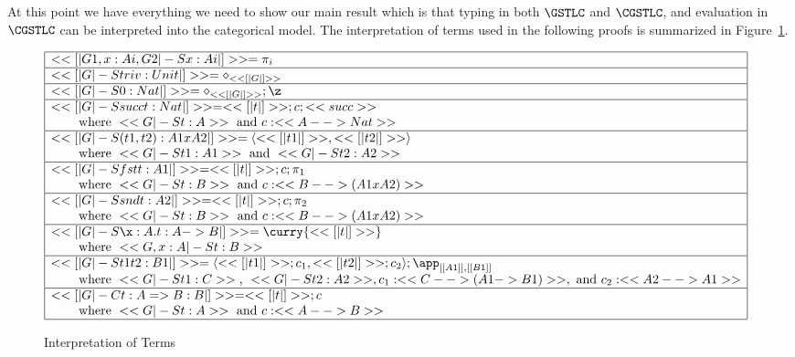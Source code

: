 At this point we have everything we need to show our main result which
is that typing in both $\GSTLC$ and $\CGSTLC$, and evaluation in
$\CGSTLC$ can be interpreted into the categorical model.  The
interpretation of terms used in the following proofs is summarized in
Figure~\ref{fig:interp-terms}.
\begin{figure}
  \small  
    \begin{center}
      \begin{math}
          \begin{array}{|l|}
            \hline
            << [| G1 , x : Ai , G2 |-S x : Ai |] >> = \pi_i\\
            \hline
            << [| G |-S triv : Unit |] >> = \diamond_{<< [| G |] >>}\\
            \hline
            << [| G |-S 0 : Nat |] >> = \diamond_{<< [| G |] >>};\z\\
            \hline
            << [| G |-S succ t : Nat |] >> = << [| t |] >>;c;<<succ>>\\
            \,\,\,\,\,\,\,\,\,\,\,\text{ where } <<G |-S t : A>>\text{ and }c : <<A --> Nat>>\\
            \hline
            << [| G |-S (t1,t2) : A1 x A2 |] >> = \langle << [| t1 |] >> , << [| t2 |] >> \rangle\\
            \,\,\,\,\,\,\,\,\,\,\,\text{ where } <<G |-S t1 : A1>>\text{ and } <<G |-S t2 : A2>>\\
            \hline
            << [| G |-S fst t : A1 |] >> = << [| t |] >>;c;\pi_1\\
            \,\,\,\,\,\,\,\,\,\,\,\text{ where } <<G |-S t : B>>\text{ and }c : <<B --> (A1 x A2)>>\\
            \hline
            << [| G |-S snd t : A2 |] >> = << [| t |] >>;c;\pi_2\\           
            \,\,\,\,\,\,\,\,\,\,\,\text{ where } <<G |-S t : B>>\text{ and }c : <<B --> (A1 x A2)>>\\
            \hline
            << [| G |-S \x:A.t : A -> B |] >> = \curry{<< [| t |] >>}\\
            \,\,\,\,\,\,\,\,\,\,\,\text{ where } <<G, x : A |-S t : B>>\\
            \hline
            << [| G |-S t1 t2 : B1 |] >> = \langle << [| t1 |] >>;c_1, << [| t2 |] >>;c_2\rangle;\app_{[[A1]],[[B1]]}\\
            \,\,\,\,\,\,\,\,\,\,\,\text{ where } <<G |-S t1 : C>>\text{, }<<G |-S t2 : A2>>, c_1 : <<C --> (A1 -> B1)>>, \text{ and }c_2 : <<A2 --> A1>>\\
            \hline
            << [| G |-C t : {A} => {B} : B |] >> = << [| t |] >>;c\\
            \,\,\,\,\,\,\,\,\,\,\,\text{ where } <<G |-S t : A>> \text{ and }c : <<A --> B>>\\
            \hline
          \end{array}
      \end{math}
    \end{center}
  \caption{Interpretation of Terms}
  \label{fig:interp-terms}
\end{figure}
